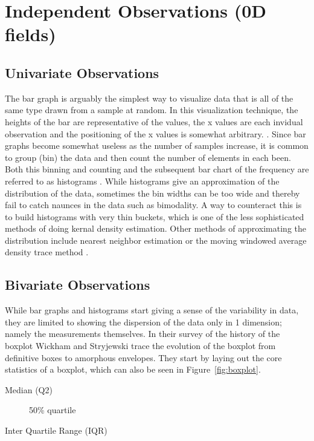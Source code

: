 \documentclass[../main.tex]{subfiles}
\begin{document}
\section{Independent Observations (0D fields)}


\subsection{Univariate Observations}

The bar graph is arguably the simplest way to visualize data that is all of the
same type drawn from a sample at random. In this visualization technique, the
heights of the bar are representative of the values, the x values are each
invidual observation and the positioning of the x values is somewhat
arbitrary. \cite{TufteVisualDIsplay, Friendly, Playfair}. Since bar
graphs become somewhat useless as the number of samples increase, it is common
to group (bin) the data and then count the number of elements in each
been. Both this binning and counting and the subsequent bar chart of the
frequency are referred to as histograms \cite{ioannidis2003}. While histograms
give an approximation of the distribution of the data, sometimes the bin widths
can be too wide and thereby fail to catch naunces in the data such as
bimodality. A way to counteract this is to build histograms with very thin
buckets, which is one of the less sophisticated methods of doing kernal density
estimation. Other methods of approximating the distribution include nearest
neighbor estimation or the  moving windowed average density trace method \cite{chambers1983}.


\subsection{Bivariate Observations}

While bar graphs and histograms start giving a sense of the variability in
data, they are limited to showing the dispersion of the data only in 1
dimension; namely the measurements themselves. In their survey of the history
of the boxplot \cite{wickham2011} Wickham and Stryjewski trace the evolution of
the boxplot from definitive boxes to amorphous envelopes.  They start by laying
out the core statistics of a boxplot, which can also be seen in Figure~\ref{fig:boxplot}.
\begin{description}

\item[Median (Q2)] 50\% quartile
\item[Inter Quartile Range (IQR)]
\end{description}
\end{document}
